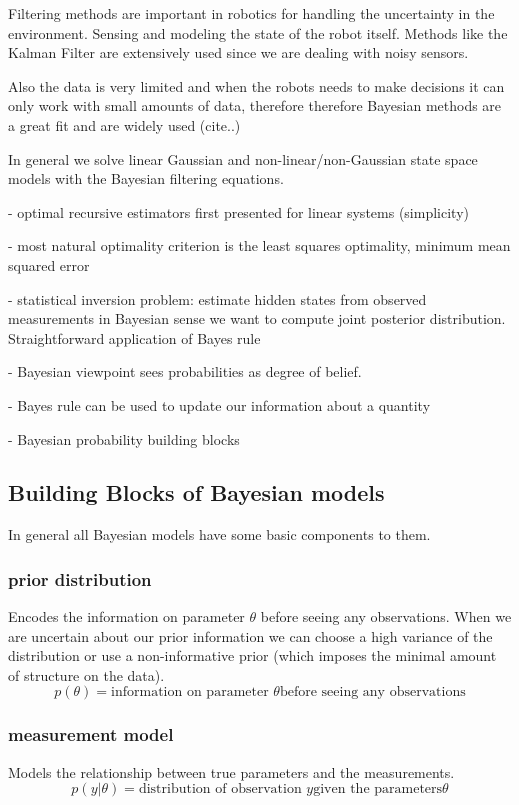 Filtering methods are important in robotics for handling the uncertainty in the
environment. Sensing and modeling the state of the robot itself.
Methods like the Kalman Filter are extensively used since we are dealing with noisy sensors.

Also the data is very limited and when the robots needs to make
decisions it can only work with small amounts of data, therefore
therefore Bayesian methods are a great fit and are widely used (cite..)

In general we solve linear Gaussian and non-linear/non-Gaussian state space
models with the Bayesian filtering equations.

- optimal recursive estimators first presented for linear systems (simplicity)

- most natural optimality criterion is the least squares optimality,
minimum mean squared error

- statistical inversion problem: estimate hidden states from observed
measurements in Bayesian sense we want to compute joint posterior distribution.
Straightforward application of Bayes rule

- Bayesian viewpoint sees probabilities as degree of belief.

- Bayes rule can be used to update our information about a quantity

- Bayesian probability building blocks

\subsection{Building Blocks of Bayesian models}
In general all Bayesian models have some basic components to them.

\subsubsection{prior distribution}
Encodes the information on parameter $\theta$ before seeing any
observations. When we are uncertain about our prior information
we can choose a high variance of the distribution or use a
non-informative prior (which imposes the minimal amount of structure
on the data).
$$ p(\theta) = \text{information on parameter } \theta
\text{before seeing any observations} $$

\subsubsection{measurement model}
Models the relationship between true parameters and the measurements.
$$ p(y | \theta) = \text{distribution of observation } y
\text{given the parameters} \theta $$

